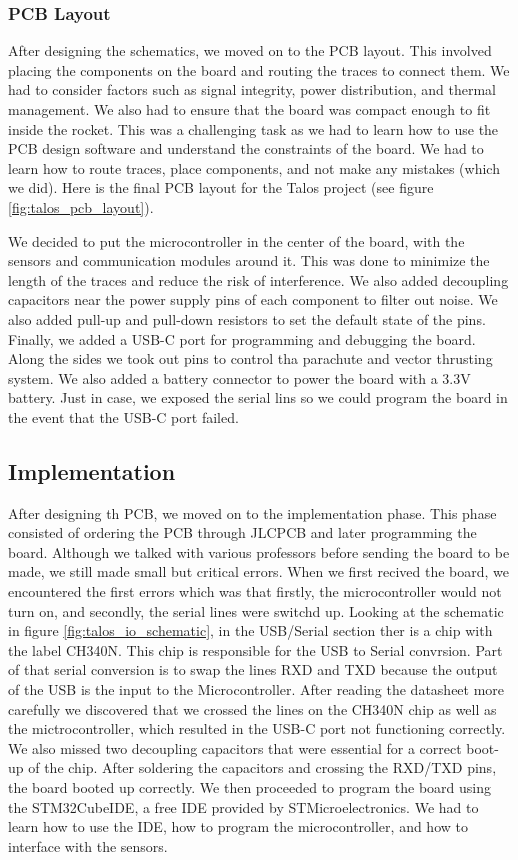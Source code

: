 \documentclass{article}
\begin{document}
\subsubsection{PCB Layout}
After designing the schematics, we moved on to the PCB layout. This involved placing the components on the board and routing the traces to connect them. We had to consider factors such as signal integrity, power distribution, and thermal management. We also had to ensure that the board was compact enough to fit inside the rocket. This was a challenging task as we had to learn how to use the PCB design software and understand the constraints of the board. We had to learn how to route traces, place components, and not make any mistakes (which we did). Here is the final PCB layout for the Talos project (see figure \ref{fig:talos_pcb_layout}).


We decided to put the microcontroller in the center of the board, with the sensors and communication modules around it. This was done to minimize the length of the traces and reduce the risk of interference. We also added decoupling capacitors near the power supply pins of each component to filter out noise. We also added pull-up and pull-down resistors to set the default state of the pins. Finally, we added a USB-C port for programming and debugging the board. Along the sides we took out pins to control tha parachute and vector thrusting system. We also added a battery connector to power the board with a 3.3V battery. Just in case, we exposed the serial lins so we could program the board in the event that the USB-C port failed.

\subsection{Implementation}
After designing th PCB, we moved on to the implementation phase. This phase consisted of ordering the PCB through JLCPCB and later programming the board. Although we talked with various professors before sending the board to be made, we still made small but critical errors. When we first recived the board, we encountered the first errors which was that firstly, the microcontroller would not turn on, and secondly, the serial lines were switchd up. Looking at the schematic in figure \ref{fig:talos_io_schematic}, in the USB/Serial section ther is a chip with the label CH340N. This chip is responsible for the USB to Serial convrsion. Part of that serial conversion is to swap the lines RXD and TXD because the output of the USB is the input to the Microcontroller. After reading the datasheet more carefully we discovered that we crossed the lines on the CH340N chip as well as the mictrocontroller, which resulted in the USB-C port not functioning correctly. We also missed two decoupling capacitors that were essential for a correct boot-up of the chip. After soldering the capacitors and crossing the RXD/TXD pins, the board booted up correctly. We then proceeded to program the board using the STM32CubeIDE, a free IDE provided by STMicroelectronics\cite{STM32CubeIDE}. We had to learn how to use the IDE, how to program the microcontroller, and how to interface with the sensors.
\newpage

\printbibliography
\end{document}
